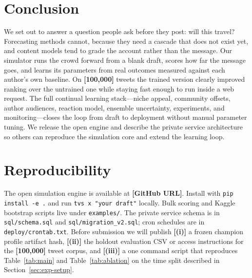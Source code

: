 \documentclass[11pt]{article}
\newcommand{\fill}[1]{\textbf{[#1]}}
\begin{document}
\section{Conclusion}

We set out to answer a question people ask before they post: will this travel?
Forecasting methods cannot, because they need a cascade that does not exist yet,
and content models tend to grade the account rather than the message. Our
simulator runs the crowd forward from a blank draft, scores how far the message
goes, and learns its parameters from real outcomes measured against each author's
own baseline. On \fill{100{,}000} tweets the trained version clearly improved
ranking over the untrained one while staying fast enough to run inside a web
request. The full continual learning stack---niche appeal, community offsets,
author audiences, reaction model, ensemble uncertainty, experiments, and
monitoring---closes the loop from draft to deployment without manual parameter
tuning. We release the open engine and describe the private service architecture
so others can reproduce the simulation core and extend the learning loop.

\section*{Reproducibility}

The open simulation engine is available at \fill{GitHub URL}. Install with
\texttt{pip install -e .} and run \texttt{tvs x "your draft"} locally. Bulk
scoring and Kaggle bootstrap scripts live under \texttt{examples/}. The private
service schema is in \texttt{sql/schema.sql} and \texttt{sql/migration\_v2.sql};
cron schedules are in \texttt{deploy/crontab.txt}. Before submission we will
publish \fill{(i)} a frozen champion profile artifact hash, \fill{(ii)} the
holdout evaluation CSV or access instructions for the \fill{100{,}000} tweet
corpus, and \fill{(iii)} a one command script that reproduces Table~\ref{tab:main}
and Table~\ref{tab:ablation} on the time split described in
Section~\ref{sec:exp-setup}.
\end{document}
